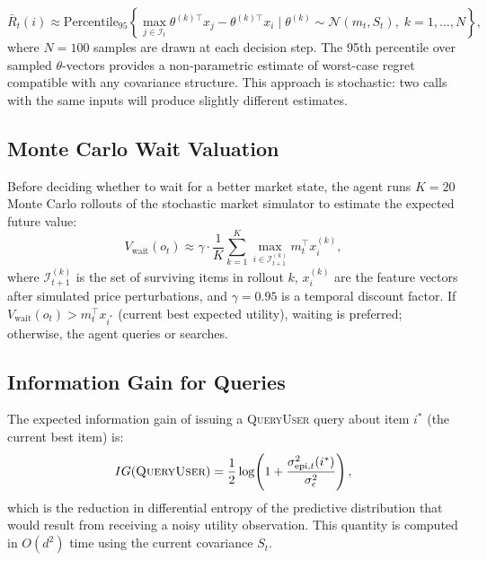 \documentclass[11pt,letterpaper]{article}
\newcommand{\QueryUser}{\textsc{QueryUser}}
\newcommand{\Rbar}{\bar{R}}
\begin{document}
\begin{equation}
    \Rbar_t(i) \approx \mathrm{Percentile}_{95}\!\left\{ \max_{j \in \mathcal{I}_t} \theta^{(k)\top} x_j - \theta^{(k)\top} x_i \;\Big|\; \theta^{(k)} \sim \mathcal{N}(m_t, S_t),\; k=1,\dots,N \right\},
    \label{eq:minimax_regret}
\end{equation}
where $N = 100$ samples are drawn at each decision step.  The 95th percentile over sampled $\theta$-vectors provides a non-parametric estimate of worst-case regret compatible with any covariance structure.  This approach is stochastic: two calls with the same inputs will produce slightly different estimates.

\subsection{Monte Carlo Wait Valuation}

Before deciding whether to wait for a better market state, the agent runs $K = 20$ Monte Carlo rollouts of the stochastic market simulator to estimate the expected future value:
\begin{equation}
    V_{\mathrm{wait}}(o_t) \approx \gamma \cdot \frac{1}{K} \sum_{k=1}^K \max_{i \in \mathcal{I}_{t+1}^{(k)}} m_t^\top x_i^{(k)},
    \label{eq:wait_value}
\end{equation}
where $\mathcal{I}_{t+1}^{(k)}$ is the set of surviving items in rollout $k$, $x_i^{(k)}$ are the feature vectors after simulated price perturbations, and $\gamma = 0.95$ is a temporal discount factor.  If $V_{\mathrm{wait}}(o_t) > m_t^\top x_{i^*}$ (current best expected utility), waiting is preferred; otherwise, the agent queries or searches.

\subsection{Information Gain for Queries}

The expected information gain of issuing a \QueryUser{} query about item $i^*$ (the current best item) is:
\begin{equation}
    IG(\QueryUser) = \frac{1}{2} \log\!\left(1 + \frac{\sigma_{\mathrm{epi},t}^2(i^*)}{\sigma_\epsilon^2}\right),
    \label{eq:ig}
\end{equation}
which is the reduction in differential entropy of the predictive distribution that would result from receiving a noisy utility observation.  This quantity is computed in $O(d^2)$ time using the current covariance $S_t$.
\end{document}
